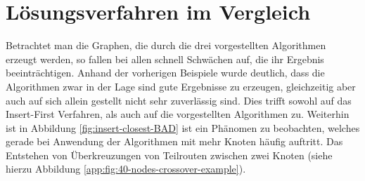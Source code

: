 \section{Lösungsverfahren im Vergleich}
Betrachtet man die Graphen, die durch die drei vorgestellten Algorithmen erzeugt werden, so fallen bei allen schnell Schwächen auf, die ihr Ergebnis beeinträchtigen.
Anhand der vorherigen Beispiele wurde deutlich, dass die Algorithmen zwar in der Lage sind gute Ergebnisse zu erzeugen, gleichzeitig aber auch auf sich allein gestellt nicht sehr zuverlässig sind.
Dies trifft sowohl auf das Insert-First Verfahren, als auch auf die vorgestellten Algorithmen zu.
Weiterhin ist in Abbildung \vref{fig:insert-closest-BAD} ist ein Phänomen zu beobachten, welches gerade bei Anwendung der Algorithmen mit mehr Knoten häufig auftritt.
Das Entstehen von Überkreuzungen von Teilrouten zwischen zwei Knoten (siehe hierzu Abbildung \vref{app:fig:40-nodes-crossover-example}).
